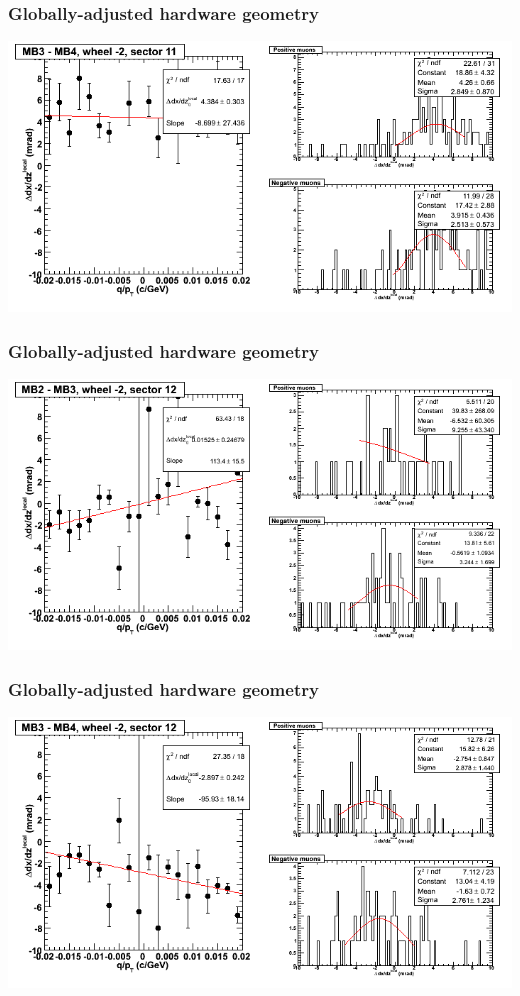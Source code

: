 \documentclass[compress]{beamer}
\begin{document}
\begin{frame}
\frametitle{Globally-adjusted hardware geometry}
\includegraphics[width=\linewidth]{NOV4_segdiffs_HW/dt13_slope_A_11_34.png}
\end{frame}

\begin{frame}
\frametitle{Globally-adjusted hardware geometry}
\includegraphics[width=\linewidth]{NOV4_segdiffs_HW/dt13_slope_A_12_23.png}
\end{frame}

\begin{frame}
\frametitle{Globally-adjusted hardware geometry}
\includegraphics[width=\linewidth]{NOV4_segdiffs_HW/dt13_slope_A_12_34.png}
\end{frame}
\end{document}
